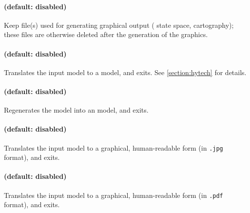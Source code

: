 \paragraph{ (default: disabled)}
Keep file(s) used for generating graphical output (\eg{} state space, cartography); these files are otherwise deleted after the generation of the graphics.





\paragraph{ (default: disabled)}
Translates the input model to a \hytech{} model, and exits.
See \cref{section:hytech} for details.

\paragraph{ (default: disabled)}
Regenerates the model into an \imitator{} model, and exits.

\paragraph{ (default: disabled)}
Translates the input model to a graphical, human-readable form (in \texttt{.jpg} format), and exits.

\paragraph{ (default: disabled)}
Translates the input model to a graphical, human-readable form (in \texttt{.pdf} format), and exits.

